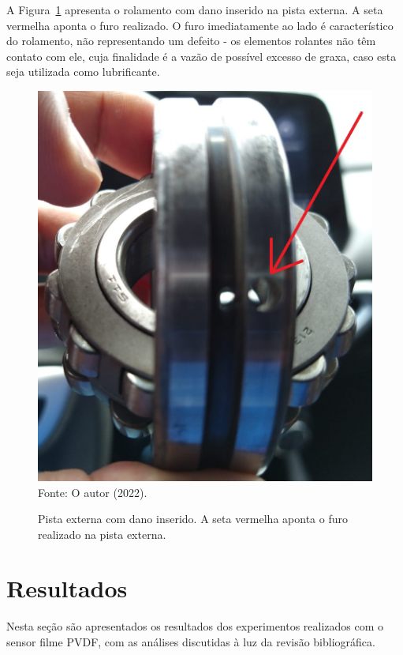 \documentclass[
	12pt,				
	oneside,			
	a4paper,			
	english,			
	brazil,			
	]{abntex2ppgsi}
\begin{document}
A Figura~\ref{dano_pista_externa} apresenta o rolamento com dano inserido na pista externa. A seta vermelha aponta o furo realizado. O furo imediatamente ao lado é característico do rolamento, não representando um defeito - os elementos rolantes não têm contato com ele, cuja finalidade é a vazão de possível excesso de graxa, caso esta seja utilizada como lubrificante.

\begin{figure}[H]
\centering
\caption {Pista externa com dano inserido. A seta vermelha aponta o furo realizado na pista externa.}
\includegraphics[width=\textwidth,keepaspectratio]{dano_pista_externa} \\
Fonte: O autor (2022).
\label{dano_pista_externa}
\end{figure}

\chapter{Resultados}

Nesta seção são apresentados os resultados dos experimentos realizados com o sensor filme PVDF, com as análises discutidas à luz da revisão bibliográfica. 
\end{document}

